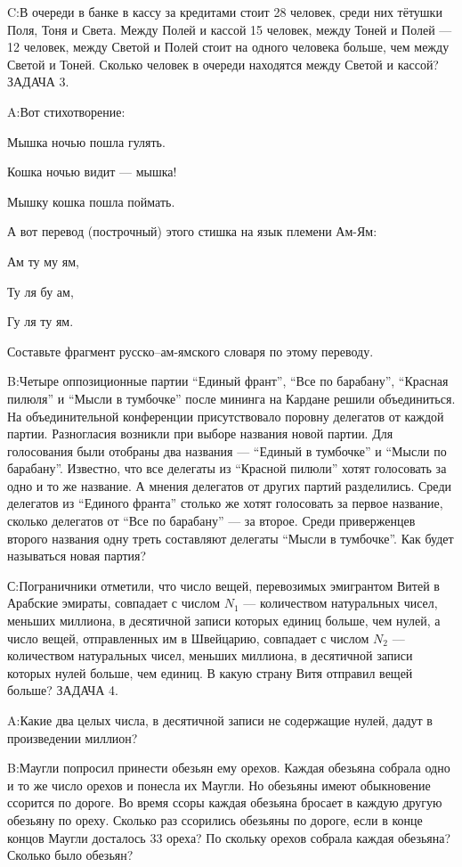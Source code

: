 \documentclass[10pt]{scrbook} \usepackage{modules/nonstahp_book}
\begin{document}
C:\qquad В очереди в банке в кассу за кредитами стоит 28 человек, среди них тётушки Поля, Тоня и Света. Между Полей и кассой 15 человек, между Тоней и Полей --- 12 человек, между Светой и Полей стоит на одного человека больше, чем между Светой и Тоней. Сколько человек в очереди находятся между Светой и кассой?
\medbreak
\noindent
ЗАДАЧА 3.

A:\qquad Вот стихотворение:

Мышка ночью пошла гулять.

Кошка ночью видит --- мышка!

Мышку кошка пошла поймать.

А вот перевод (построчный) этого стишка на язык племени Ам-Ям:

Ам ту му ям,

Ту ля бу ам,

Гу ля ту ям.

Составьте фрагмент русско--ам-ямского словаря по этому переводу.

B:\qquad Четыре оппозиционные партии ``Единый франт'', ``Все по барабану'', ``Красная пилюля'' и ``Мысли в тумбочке'' после мининга на Кардане решили объединиться. На объединительной конференции присутствовало поровну делегатов от каждой партии. Разногласия возникли при выборе названия новой партии. Для голосования были отобраны два названия --- ``Единый в тумбочке'' и ``Мысли по барабану''.  Известно, что все делегаты из ``Красной пилюли'' хотят голосовать за одно и то же название. А мнения делегатов от других партий разделились. Среди делегатов из ``Единого франта'' столько же хотят голосовать за первое название, сколько делегатов от ``Все по барабану'' --- за второе. Среди приверженцев второго названия одну треть составляют делегаты ``Мысли в тумбочке''. Как будет называться новая партия?

С:\qquad Пограничники отметили, что число вещей, перевозимых эмигрантом  Витей в Арабские эмираты, совпадает с числом $N_1$ --- количеством натуральных чисел, меньших миллиона, в десятичной записи которых единиц больше, чем нулей, а число вещей, отправленных им в Швейцарию, совпадает с числом $N_2$ --- количеством натуральных чисел, меньших миллиона, в десятичной записи которых нулей больше, чем единиц. В какую страну  Витя отправил вещей больше?
\medbreak
\noindent
ЗАДАЧА 4.

A:\qquad Какие два целых числа, в десятичной записи не содержащие нулей, дадут в произведении миллион?

B:\qquad  Маугли попросил принести обезьян ему орехов. Каждая обезьяна собрала одно и то же число орехов и понесла их Маугли.
Но обезьяны имеют обыкновение ссорится по дороге. Во время ссоры
каждая обезьяна бросает в каждую другую обезьяну по ореху. Сколько раз ссорились обезьяны по дороге, если в конце концов Маугли досталось 33 ореха? По скольку орехов собрала каждая обезьяна? Сколько было обезьян?
\medbreak
\noindent
\end{document}
